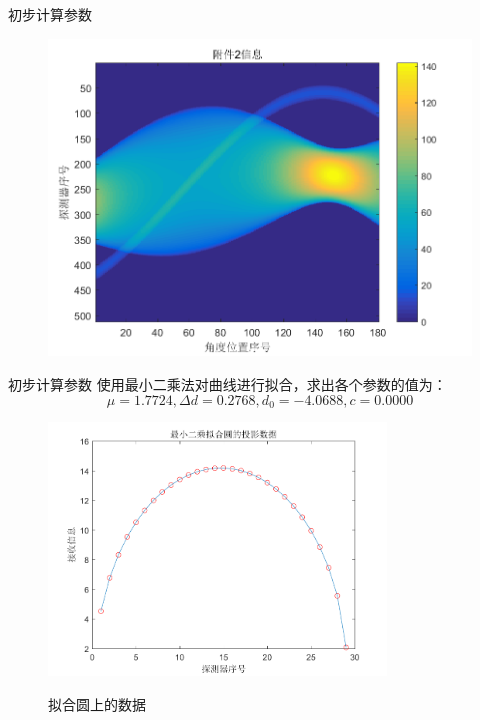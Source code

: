 \documentclass{beamer}
\begin{document}
\begin{frame}{初步计算参数}
\begin{figure}[H]
\begin{minipage}[H]{0.45\textwidth}
		\includegraphics[width=\textwidth]{./pic/fujian2.png}
		\end{minipage}
	\end{figure}

\end{frame}

\begin{frame}{初步计算参数}
	\small 使用最小二乘法对曲线进行拟合，求出各个参数的值为：
	\[\mu =1.7724 , \Delta d = 0.2768, d_0 = -4.0688, c = 0.0000\]
	\begin{figure}[H]
		\centering
		\includegraphics[width=0.8\textwidth]{./pic/fitCir.png}\\
		\caption{拟合圆上的数据}
	  \end{figure}

\end{frame}
\end{document}
